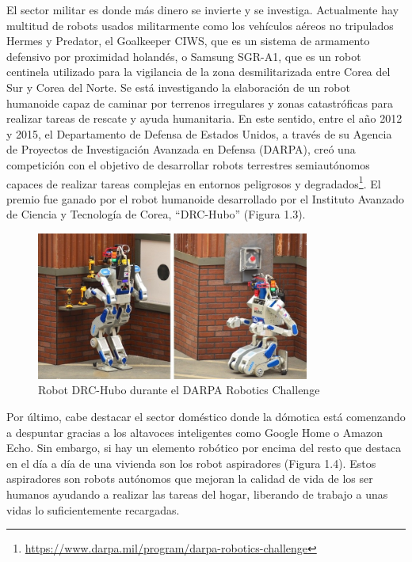 El sector militar es donde más dinero se invierte y se investiga. Actualmente hay multitud de robots usados militarmente como los vehículos aéreos no tripulados Hermes y Predator, el Goalkeeper CIWS, que es un sistema de armamento defensivo por proximidad holandés, o Samsung SGR-A1, que es un robot centinela utilizado para la vigilancia de la zona desmilitarizada entre Corea del Sur y Corea del Norte. Se está investigando la elaboración de un robot humanoide capaz de caminar por terrenos irregulares y zonas catastróficas para realizar tareas de rescate y ayuda humanitaria. En este sentido, entre el año 2012 y 2015, el Departamento de Defensa de Estados Unidos, a través de su Agencia de Proyectos  de Investigación Avanzada en Defensa (DARPA), creó una competición con el objetivo de desarrollar robots terrestres semiautónomos capaces de realizar tareas complejas en entornos peligrosos y degradados\footnote{\url{https://www.darpa.mil/program/darpa-robotics-challenge}}. El premio fue ganado por el robot humanoide desarrollado por el Instituto Avanzado de Ciencia y Tecnología de Corea, ``DRC-Hubo'' (Figura 1.3).
\begin{figure}[H]
  \begin{center}
    \includegraphics[width=0.8\textwidth]{figures/drchubo.jpg}
		\caption{Robot DRC-Hubo durante el DARPA Robotics Challenge}
		\label{fig.drchubo}
		\end{center}
\end{figure}

Por último, cabe destacar el sector doméstico donde la dómotica está comenzando a despuntar gracias a los altavoces inteligentes como Google Home o Amazon Echo. Sin embargo, si hay un elemento robótico por encima del resto que destaca en el día a día de una vivienda son los robot aspiradores (Figura 1.4). Estos aspiradores son robots autónomos que mejoran la calidad de vida de los ser humanos ayudando a realizar las tareas del hogar, liberando de trabajo a unas vidas lo suficientemente recargadas.

